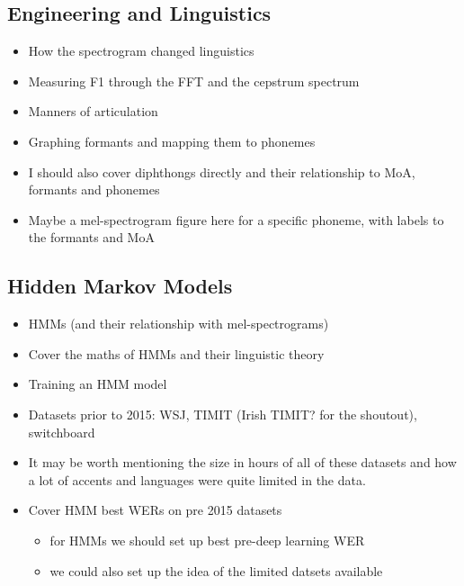 \subsection{Engineering and Linguistics}
\begin{itemize}
    \item How the spectrogram changed linguistics
    \item Measuring F1 through the FFT and the cepstrum spectrum
    \item Manners of articulation
    \item Graphing formants and mapping them to phonemes
    \item I should also cover diphthongs directly and their relationship to MoA, formants and phonemes
    \item Maybe a mel-spectrogram figure here for a specific phoneme, with labels to the formants and MoA
\end{itemize}

\subsection{Hidden Markov Models}
\begin{itemize}
    \item HMMs (and their relationship with mel-spectrograms)
    \item Cover the maths of HMMs and their linguistic theory
    \item Training an HMM model
    \item Datasets prior to 2015: WSJ, TIMIT (Irish TIMIT? for the shoutout), switchboard
    \item It may be worth mentioning the size in hours of all of these datasets and how a lot of accents and languages were quite limited in the data.
    \item Cover HMM best WERs on pre 2015 datasets
        \begin{itemize}
            \item for HMMs we should set up best pre-deep learning WER
            \item we could also set up the idea of the limited datsets available
        \end{itemize}
\end{itemize}

